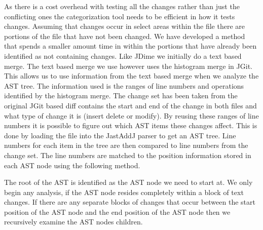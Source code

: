 As there is a cost overhead with testing all the changes rather than just the conflicting ones the categorization tool needs to be efficient in how it tests changes.  Assuming that changes occur in select areas within the file there are portions of the file that have not been changed.  We have developed a method that spends a smaller amount time in  within the portions that have already been identified as not containing changes.  Like JDime we initially do a text based merge.  The text based merge we use however uses the histogram merge in JGit.  This allows us to use information from the text based merge when we analyze the AST tree.  The information used is the ranges of line numbers and operations identified by the histogram merge. The change set has been taken from the original JGit based diff contains the start and end of the change in both files and what type of change it is (insert delete or modify).  By reusing these ranges of line numbers it is possible to figure out which AST items these changes affect. This is done by loading the file into the JastAddJ parser to get an AST tree. Line numbers for each item in the tree are then compared to line numbers from the change set. The line numbers are matched to the position information stored in each AST node using the following method.

The root of the AST is identified as the AST node we need to start at. 
We only begin any analysis, if the AST node resides completely within a block of text changes.
If there are any separate blocks of changes that occur between the start position of the AST node and the end position of the AST node then we recursively examine the AST nodes children.

% 
% 



